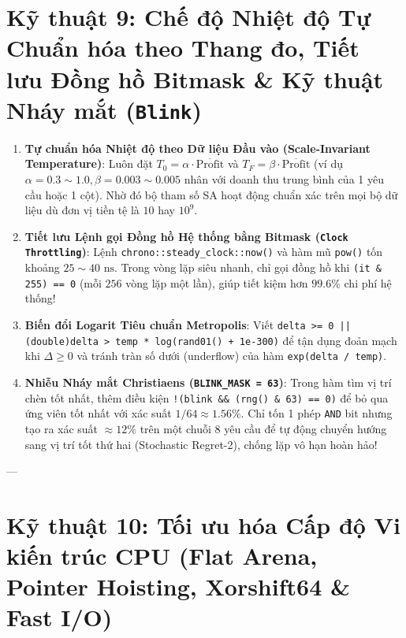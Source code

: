 \documentclass[11pt,a4paper]{article}
\begin{document}
\section{Kỹ thuật 9: Chế độ Nhiệt độ Tự Chuẩn hóa theo Thang đo, Tiết lưu Đồng hồ Bitmask \& Kỹ thuật Nháy mắt (\texttt{Blink})}

\begin{enumerate}[leftmargin=1.5em]
    \item \textbf{Tự chuẩn hóa Nhiệt độ theo Dữ liệu Đầu vào (Scale-Invariant Temperature)}:
    Luôn đặt $T_0 = \alpha \cdot \overline{\text{Profit}}$ và $T_F = \beta \cdot \overline{\text{Profit}}$ (ví dụ $\alpha = 0.3\sim 1.0, \beta = 0.003\sim 0.005$ nhân với doanh thu trung bình của 1 yêu cầu hoặc 1 cột). Nhờ đó bộ tham số SA hoạt động chuẩn xác trên mọi bộ dữ liệu dù đơn vị tiền tệ là $10$ hay $10^9$.
    \item \textbf{Tiết lưu Lệnh gọi Đồng hồ Hệ thống bằng Bitmask (\texttt{Clock Throttling})}:
    Lệnh \texttt{chrono::steady\_clock::now()} và hàm mũ \texttt{pow()} tốn khoảng $25\sim 40\text{ ns}$. Trong vòng lặp siêu nhanh, chỉ gọi đồng hồ khi \texttt{(it \& 255) == 0} (mỗi $256$ vòng lặp một lần), giúp tiết kiệm hơn $99.6\%$ chi phí hệ thống!
    \item \textbf{Biến đổi Logarit Tiêu chuẩn Metropolis}:
    Viết \texttt{delta >= 0 || (double)delta > temp * log(rand01() + 1e-300)} để tận dụng đoản mạch khi $\Delta \ge 0$ và tránh tràn số dưới (underflow) của hàm \texttt{exp(delta / temp)}.
    \item \textbf{Nhiễu Nháy mắt Christiaens (\texttt{BLINK\_MASK = 63})}:
    Trong hàm tìm vị trí chèn tốt nhất, thêm điều kiện \texttt{!(blink \&\& (rng() \& 63) == 0)} để bỏ qua ứng viên tốt nhất với xác suất $1/64 \approx 1.56\%$. Chỉ tốn 1 phép \texttt{AND} bit nhưng tạo ra xác suất $\approx 12\%$ trên một chuỗi 8 yêu cầu để tự động chuyển hướng sang vị trí tốt thứ hai (Stochastic Regret-2), chống lặp vô hạn hoàn hảo!
\end{enumerate}

---

\section{Kỹ thuật 10: Tối ưu hóa Cấp độ Vi kiến trúc CPU (Flat Arena, Pointer Hoisting, Xorshift64 \& Fast I/O)}
\end{document}
